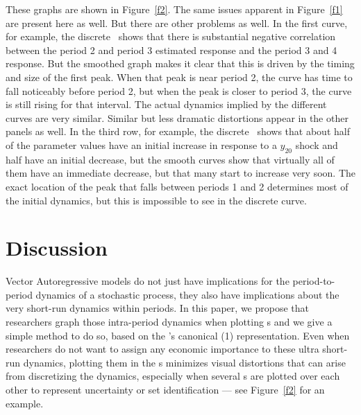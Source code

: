 \documentclass[12pt,fleqn]{article}
\begin{document}
These graphs are shown in Figure~\ref{f2}. The same issues apparent in
Figure~\ref{f1} are present here as well. But there are other problems
as well. In the first curve, for example, the discrete \IRF\ shows
that there is substantial negative correlation between the period 2
and period 3 estimated response and the period 3 and 4 response. But
the smoothed graph makes it clear that this is driven by the timing
and size of the first peak. When that peak is near period 2, the curve
has time to fall noticeably before period 2, but when the peak is
closer to period 3, the curve is still rising for that interval. The
actual dynamics implied by the different curves are very
similar. Similar but less dramatic distortions appear in the other
panels as well. In the third row, for example, the discrete \IRF\
shows that about half of the parameter values have an initial increase
in response to a $y_{20}$ shock and half have an initial decrease, but
the smooth curves show that virtually all of them have an immediate
decrease, but that many start to increase very soon. The exact
location of the peak that falls between periods 1 and 2 determines
most of the initial dynamics, but this is impossible to see in the
discrete curve.

\section{Discussion}

Vector Autoregressive models do not just have implications for the
period-to-period dynamics of a stochastic process, they also have
implications about the very short-run dynamics within periods. In this
paper, we propose that researchers graph those intra-period dynamics
when plotting \IRF s and we give a simple method to do so, based on
the \VAR's canonical \VAR(1) representation. Even when researchers do
not want to assign any economic importance to these ultra short-run
dynamics, plotting them in the \IRF s minimizes visual distortions
that can arise from discretizing the dynamics, especially when several
\IRF s are plotted over each other to represent uncertainty or set
identification --- see Figure~\ref{f2} for an example.


\end{document}
